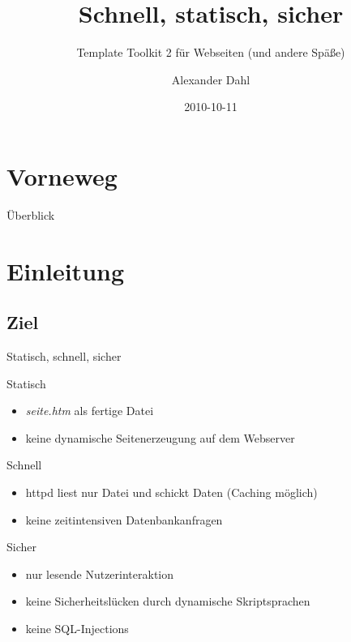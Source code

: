 \documentclass[hyperref={pdfpagelabels=false}]{beamer}
\title[Template Toolkit 2]{Schnell, statisch, sicher}
\subtitle{Template Toolkit 2 für Webseiten (und andere Späße)}
\author{Alexander Dahl}
\institute[lespocky.de]{\url{http://www.lespocky.de/}}
\date{2010-10-11}
\begin{document}
 

\begin{frame}
	\titlepage
\end{frame}

\section{Vorneweg}

\begin{frame}{Überblick}
    \tableofcontents
\end{frame}

\section{Einleitung}

\subsection{Ziel}

\begin{frame}{Statisch, schnell, sicher}
    \begin{block}{Statisch}
        \begin{itemize}
            \item \emph{seite.htm} als fertige Datei
            \item keine dynamische Seitenerzeugung auf dem Webserver
        \end{itemize}
    \end{block}
    \pause
    \begin{block}{Schnell}
        \begin{itemize}
            \item httpd liest nur Datei und schickt Daten (Caching möglich)
            \item keine zeitintensiven Datenbankanfragen
        \end{itemize}
    \end{block}
    \pause
    \begin{block}{Sicher}
        \begin{itemize}
            \item nur lesende Nutzerinteraktion
            \item keine Sicherheitslücken durch dynamische Skriptsprachen
            \item keine SQL-Injections
        \end{itemize}
    \end{block}
\end{frame}
\end{document}
